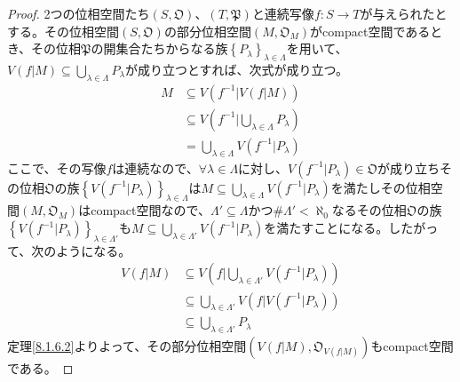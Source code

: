 \documentclass[dvipdfmx]{jsarticle}
\begin{document}
\begin{proof}
2つの位相空間たち$\left( S,\mathfrak{O} \right)$、$\left( T,\mathfrak{P} \right)$と連続写像$f:S \rightarrow T$が与えられたとする。その位相空間$\left( S,\mathfrak{O} \right)$の部分位相空間$\left( M,\mathfrak{O}_{M} \right)$がcompact空間であるとき、その位相$\mathfrak{P}$の開集合たちからなる族$\left\{ P_{\lambda} \right\}_{\lambda \in \varLambda}$を用いて、$V\left( f|M \right) \subseteq \bigcup_{\lambda \in \varLambda} P_{\lambda}$が成り立つとすれば、次式が成り立つ。
\begin{align*}
M &\subseteq V\left( f^{- 1}|V\left( f|M \right) \right)\\
&\subseteq V\left( f^{- 1}|\bigcup_{\lambda \in \varLambda} P_{\lambda} \right)\\
&= \bigcup_{\lambda \in \varLambda} {V\left( f^{- 1}|P_{\lambda} \right)}
\end{align*}
ここで、その写像$f$は連続なので、$\forall\lambda \in \varLambda$に対し、$V\left( f^{- 1}|P_{\lambda} \right)\in \mathfrak{O}$が成り立ちその位相$\mathfrak{O}$の族$\left\{ V\left( f^{- 1}|P_{\lambda} \right) \right\}_{\lambda \in \varLambda}$は$M \subseteq \bigcup_{\lambda \in \varLambda} {V\left( f^{- 1}|P_{\lambda} \right)}$を満たしその位相空間$\left( M,\mathfrak{O}_{M} \right)$はcompact空間なので、$\varLambda' \subseteq \varLambda$かつ${\#}\varLambda' < \aleph_{0}$なるその位相$\mathfrak{O}$の族$\left\{ V\left( f^{- 1}|P_{\lambda} \right) \right\}_{\lambda \in \varLambda'}$も$M \subseteq \bigcup_{\lambda \in \varLambda'} {V\left( f^{- 1}|P_{\lambda} \right)}$を満たすことになる。したがって、次のようになる。
\begin{align*}
V\left( f|M \right) &\subseteq V\left( f|\bigcup_{\lambda \in \varLambda'} {V\left( f^{- 1}|P_{\lambda} \right)} \right)\\
&\subseteq \bigcup_{\lambda \in \varLambda'} {V\left( f|V\left( f^{- 1}|P_{\lambda} \right) \right)}\\
&\subseteq \bigcup_{\lambda \in \varLambda'} P_{\lambda}
\end{align*}
定理\ref{8.1.6.2}よりよって、その部分位相空間$\left( V\left( f|M \right),\mathfrak{O}_{V\left( f|M \right)} \right)$もcompact空間である。
\end{proof}
\end{document}
